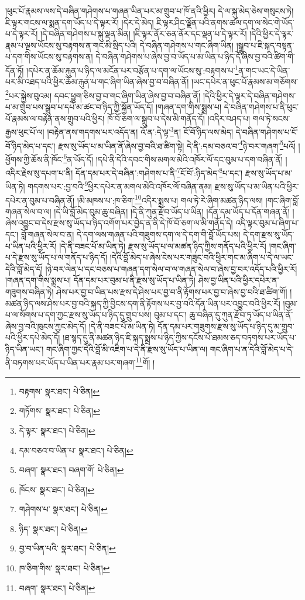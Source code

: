 །ཕུང་པོ་རྣམས་ལས་དེ་བཞིན་གཤེགས་པ་གཞན་ཡིན་པར་མ་གྲུབ་པ་ཁོ་ནའི་ཕྱིར། དེ་ལ་སྐུ་མེད་ཅེས་གསུངས་ཏེ། ཇི་ལྟར་གངས་ལ་སྨན་དག་ཡོད་པ་དེ་ལྟར་རོ། །དེར་དེ་མེད། ཇི་ལྟར་ཤིང་ལྗོན་པའི་ནགས་ཚལ་དག་ལ་སེང་གེ་ཡོད་པ་དེ་ལྟར་རོ། །དེ་བཞིན་གཤེགས་པ་སྐུ་ལྡན་མིན། །ཇི་ལྟར་ནོར་ཅན་ནོར་དང་ལྡན་པ་དེ་ལྟར་རོ། །དེའི་ཕྱིར་དེ་ལྟར་རྣམ་པ་ལྔས་ཡོངས་སུ་བརྟགས་ན་གང་མི་སྲིད་པའི། དེ་བཞིན་གཤེགས་པ་གང་ཞིག་ཡིན། །སྒྲུབ་པ་ཇི་སྐད་བསྟན་པ་དག་གིས་ཡོངས་སུ་བརྟགས་ན། དེ་བཞིན་གཤེགས་པ་ཞེས་བྱ་བ་ཡོད་པ་མ་ཡིན་པ་ཉིད་དོ་ཞེས་བྱ་བའི་ཚིག་གི་དོན་ཏོ། །དཔེར་ན་ཆོམ་རྐུན་པ་ཉིད་ལ་མངོན་པར་བརྩོན་པ་དག་ལ་ཡོངས་སུ་:བརྟགས་པ་\footnote{བརྟགས་  སྣར་ཐང་།  པེ་ཅིན། }ན་གང་ཡང་དེ་ཡིན་པར་མི་འཐད་པའི་ཕྱིར་ཆོམ་རྐུན་པ་གང་ཞིག་ཡིན་ཞེས་བྱ་བ་བཞིན་ནོ། །ཡང་དཔེར་ན་ཕུང་པོ་རྣམས་མ་གཅོགས་\footnote{གཏོགས་  སྣར་ཐང་།  པེ་ཅིན། }པར་སྐྱེས་བུའམ། དབང་ཕྱུག་ཅིས་བྱ་བ་གང་ཞིག་ཡིན་ཞེས་བྱ་བ་བཞིན་ནོ། །དེའི་ཕྱིར་དེ་ལྟར་དེ་བཞིན་གཤེགས་པ་མ་གྲུབ་པས་སྒྲུབ་པ་དཔེ་མ་ཚང་བ་ཉིད་ཀྱི་སྐྱོན་ཡོད་དོ། །གཞན་དག་གིས་སྨྲས་པ། དེ་བཞིན་གཤེགས་པ་ནི་ཕུང་པོ་རྣམས་ལ་བརྟེན་ནས་གྲུབ་པའི་ཕྱིར། ཁོ་བོ་ཅག་ལ་སྒྲུབ་པ་དེས་མི་གནོད་དོ། །འདིར་བཤད་པ། གལ་ཏེ་སངས་རྒྱས་ཕུང་པོ་ལ། །བརྟེན་ནས་གདགས་པར་འདོད་ན། འོ་ན་:དེ་ལྟ་\footnote{དེ་ལྟར་  སྣར་ཐང་།  པེ་ཅིན། }ན། ངོ་བོ་ཉིད་ལས་མེད། དེ་བཞིན་གཤེགས་པ་ངོ་བོ་ཉིད་མེད་པ་དང་། རྫས་སུ་ཡོད་པ་མ་ཡིན་ནོ་ཞེས་བྱ་བའི་ཐ་ཚིག་སྟེ། དེ་ནི་:དམ་བཅའ་བ་\footnote{དམ་བཅའ་བ་ཡིན་པ་  སྣར་ཐང་།  པེ་ཅིན། }ཉེ་བར་གཞག་\footnote{བཞག་  སྣར་ཐང་། བཞག་གོ་  པེ་ཅིན། }པའོ། །ཕྱོགས་ཀྱི་ཆོས་ནི་ཁོང་\footnote{ཁོངས་  སྣར་ཐང་།  པེ་ཅིན། }ན་ཡོད་དོ། །དཔེ་ནི་དེའི་དབང་གིས་མགལ་མེའི་འཁོར་ལོ་དང་བུམ་པ་དག་བཞིན་ནོ། །འདིར་རྗེས་སུ་དཔག་པ་ནི། དོན་དམ་པར་དེ་བཞིན་:གཤེགས་པ་ནི་\footnote{གཤེགས་པ་  སྣར་ཐང་།  པེ་ཅིན། }ངོ་བོ་:ཉིད་མེད་\footnote{ཉིད་  སྣར་ཐང་།  པེ་ཅིན། }པ་དང་། རྫས་སུ་ཡོད་པ་མ་ཡིན་ཏེ། གདགས་པར་:བྱ་བའི་\footnote{བྱ་བ་ཡིན་པའི་  སྣར་ཐང་།  པེ་ཅིན། }ཕྱིར་དཔེར་ན་མགལ་མེའི་འཁོར་ལོ་བཞིན་ནམ། རྫས་སུ་ཡོད་པ་མ་ཡིན་པའི་ཕྱིར་དཔེར་ན་བུམ་པ་བཞིན་ནོ། །མི་མཁས་པ་:ཁ་ཅིག་\footnote{ཁ་ཅིག་གིས་  སྣར་ཐང་།  པེ་ཅིན། }འདིར་སྨྲས་པ། གལ་ཏེ་རེ་ཞིག་མཚན་ཉིད་ལས། །གང་ཞིག་བློ་གཞན་སེལ་བ་ལ། །དེ་ཡི་བློ་མེད་བུམ་ཆུ་བཞིན། །དེ་ནི་ཀུན་རྫོབ་ཡོད་པ་ཡིན། །དོན་དམ་ཡོད་པ་དོན་གཞན་ནོ། །ཞེས་འབྱུང་བ་དེས་རྫས་སུ་ཡོད་པ་ཉིད་འགོག་པར་བྱེད་ན་ནི་དེ་ཁོ་བོ་ཅག་ལ་མི་གནོད་དེ། འདི་ལྟར་བུམ་པ་ཞིག་པ་དང་། བློ་གཞན་སེལ་བ་ན། དེ་དག་ལས་གཞན་པའི་གཟུགས་དག་ལ་དེ་དག་གི་བློ་ཡོད་པས། དེ་དག་རྫས་སུ་ཡོད་པ་ཡིན་པའི་ཕྱིར་རོ། །དེ་ནི་བཟང་པོ་མ་ཡིན་ཏེ། རྫས་སུ་ཡོད་པ་ལ་མཚན་ཉིད་ཀྱིས་གནོད་པའི་ཕྱིར་རོ། །གང་ཞིག་པ་དེ་རྫས་སུ་ཡོད་པ་ལ་གནོད་པ་ཉིད་དོ། །དེའི་བློ་མེད་པ་ཞེས་ངེས་པར་གཟུང་བའི་ཕྱིར་གང་མ་ཞིག་པ་དེ་ལ་ཡང་དེའི་བློ་མེད་དོ། །ཉེ་བར་ལེན་པ་དང་བཅས་པ་གཞན་དག་སེལ་བ་ལ་གཞན་སེལ་བ་ཞེས་བྱ་བར་འདོད་པའི་ཕྱིར་རོ། །གཞན་དག་གིས་སྨྲས་པ། དོན་དམ་པར་བུམ་པ་ནི་རྫས་སུ་ཡོད་པ་ཡིན་ཏེ། ཤེས་བྱ་ཡིན་པའི་ཕྱིར་དཔེར་ན་གཟུགས་བཞིན་ཏེ། ཤེས་པར་བྱ་བ་ཡིན་པས་རྫས་དེ་ཤེས་པར་བྱ་བ་ནི་རྟོགས་པར་བྱ་བ་ཞེས་བྱ་བའི་ཐ་ཚིག་གོ། །མཚན་ཉིད་ལས་ཤེས་པར་བྱ་བའི་སྐད་ཀྱི་བྱིངས་དག་ནི་རྟོགས་པར་བྱ་བའི་དོན་ཡིན་པར་འབྱུང་བའི་ཕྱིར་རོ། །བུམ་པ་ལ་སོགས་པ་དག་ཀྱང་རྫས་སུ་ཡོད་པ་ཉིད་དུ་གྲུབ་པས། བུམ་པ་དང་། ཆུ་བཞིན་དུ་ཀུན་རྫོབ་ཏུ་ཡོད་པ་ཡིན་ནོ་ཞེས་བྱ་བའི་ཁུངས་ཀྱང་མེད་དོ། །དེ་ནི་བཟང་པོ་མ་ཡིན་ཏེ། དོན་དམ་པར་གཟུགས་རྫས་སུ་ཡོད་པ་ཉིད་དུ་མ་གྲུབ་པའི་ཕྱིར་དཔེ་མེད་དོ། །ཐ་སྙད་དུ་ནི་མཚན་ཉིད་ཇི་སྐད་སྨྲས་པ་ཉིད་ཀྱིས་དངོས་པོ་ཐམས་ཅད་བཏགས་པར་ཡོད་པ་ཉིད་ཡིན་ཡང་། གང་ཞིག་ཀྱང་དེའི་བློ་མི་འཇིག་པ་དེ་ནི་རྫས་སུ་ཡོད་པ་ཡིན་ལ། གང་ཞིག་པ་ན་དེའི་བློ་མེད་པ་དེ་ནི་བཏགས་པར་ཡོད་པ་ཡིན་པར་རྣམ་པར་གཞག་\footnote{བཞག་  སྣར་ཐང་།  པེ་ཅིན། }གོ། །
